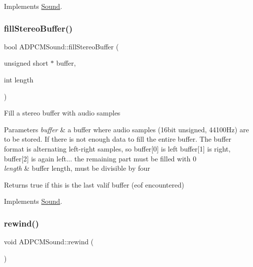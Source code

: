 Implements \hyperlink{class_sound_aa0068675e952893d2fdfef2503bcbc81}{Sound}.

\mbox{\label{class_a_d_p_c_m_sound_a04e36f00fa43f9da21bc4bd97a2ddf44}} 
\subsubsection{\texorpdfstring{fill\+Stereo\+Buffer()}{fillStereoBuffer()}}
{\footnotesize\ttfamily bool A\+D\+P\+C\+M\+Sound\+::fill\+Stereo\+Buffer (\begin{DoxyParamCaption}\item[{unsigned short $\ast$}]{buffer,  }\item[{int}]{length }\end{DoxyParamCaption})\hspace{0.3cm}{\ttfamily [virtual]}}

Fill a stereo buffer with audio samples 
\begin{DoxyParams}{Parameters}
{\em buffer} & a buffer where audio samples (16bit unsigned, 44100\+Hz) are to be stored. If there is not enough data to fill the entire buffer. The buffer format is alternating left-\/right samples, so buffer\mbox{[}0\mbox{]} is left buffer\mbox{[}1\mbox{]} is right, buffer\mbox{[}2\mbox{]} is again left... the remaining part must be filled with 0 \\
\hline
{\em length} & buffer length, must be divisible by four \\
\hline
\end{DoxyParams}
\begin{DoxyReturn}{Returns}
true if this is the last valif buffer (eof encountered) 
\end{DoxyReturn}


Implements \hyperlink{class_sound_ac514e0aa8963b40ddd328a9f79d0769b}{Sound}.

\mbox{\label{class_a_d_p_c_m_sound_ac1c8d4b362dd7803087f82f3b26f6957}} 
\subsubsection{\texorpdfstring{rewind()}{rewind()}}
{\footnotesize\ttfamily void A\+D\+P\+C\+M\+Sound\+::rewind (\begin{DoxyParamCaption}{ }\end{DoxyParamCaption})\hspace{0.3cm}{\ttfamily [virtual]}}

